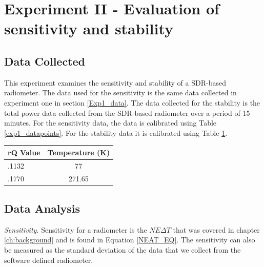{\section{Experiment II - Evaluation of sensitivity and stability} \label{Exp2_results}

\subsection{Data Collected}
This experiment examines the sensitivity and stability of a SDR-based radiometer.  The data used for the sensitivity is the same data collected in experiment one in section \ref{Exp1_data}.  The data collected for the stability is the total power data collected from the SDR-based radiometer over a period of 15 minutes.  For the sensitivity data, the data is calibrated using Table \ref{exp1_datapoints}.  For the stability data it is calibrated using Table \ref{exp2_datapoints}.

\begin{table}[h!tb] \centering
{}
\label{exp2_datapoints}
\begin{tabular}{lc} \hline
\textbf{rQ Value} & \textbf{Temperature (K)} \\ \hline
.1132 & 77 \\
.1770 & 271.65 \\ \hline
\end{tabular}
\end{table}
 
\subsection{Data Analysis}\label{Exp2_analysis}

\emph{Sensitivity.}  Sensitivity for a radiometer is the $NE\Delta T$ that was covered in chapter \ref{ch:background} and is found in Equation \ref{NEAT_EQ}.  The sensitivity can also be measured as the standard deviation of the data that we collect from the software defined radiometer.  


}

